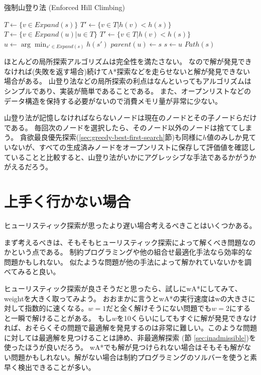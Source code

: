 \begin{algorithm}
\caption{強制山登り法 (Enforced Hill Climbing)}
	 {
	  $T \leftarrow \{v \in Expand(s)\}$\;
	  $T' \leftarrow \{v \in T | h(v) < h(s) \}$\;
           {
            $T \leftarrow \{v \in Expand(u) | u \in T\}$\;
 	    $T' \leftarrow \{v \in T | h(v) < h(s) \}$\;
          }
	  $u \leftarrow \arg \min_{s' \in Expand(s)} h(s')$\;
          $parent(u) \leftarrow s$\;
          $s \leftarrow u$\;
	}
	\Return $Path(s)$
\label{alg:enforced-hill-climbing}
\end{algorithm}


ほとんどの局所探索アルゴリズムは完全性を満たさない。
なので解が発見できなければ(失敗を返す場合)続けてA*探索などを走らせないと解が発見できない場合がある。
山登り法などの局所探索の利点はなんといってもアルゴリズムはシンプルであり、実装が簡単であることである。
また、オープンリストなどのデータ構造を保持する必要がないので消費メモリ量が非常に少ない。

山登り法が記憶しなければならないノードは現在のノードとその子ノードらだけである。
毎回次のノードを選択したら、そのノード以外のノードは捨ててしまう。
貪欲最良優先探索(\ref{sec:greedy-best-first-search}節)も同様に$h$値のみしか見ていないが、すべての生成済みノードをオープンリストに保存して評価値を確認していることと比較すると、山登り法がいかにアグレッシブな手法であるかがうかがえるだろう。

\section{上手く行かない場合}

ヒューリスティック探索が思ったより遅い場合考えるべきことはいくつかある。

まず考えるべきは、そもそもヒューリスティック探索によって解くべき問題なのかという点である。
制約プログラミングや他の組合せ最適化手法なら効率的な問題かもしれない。
似たような問題が他の手法によって解かれていないかを調べてみると良い。

ヒューリスティック探索が良さそうだと思ったら、試しにwA*にしてみて、weightを大きく取ってみよう。
おおまかに言うとwA*の実行速度はwの大きさに対して指数的に速くなる。$w=1$だと全く解けそうにない問題でも$w=2$にすると一瞬で解けることがある。
もし$w$を10くらいにしてもすぐに解が発見できなければ、おそらくその問題で最適解を発見するのは非常に難しい。このような問題に対しては最適解を見つけることは諦め、非最適解探索 (節 \ref{sec:inadmissible})を使ったほうが良いだろう。
wA*でも解が見つけられない場合はそもそも解がない問題かもしれない。解がない場合は制約プログラミングのソルバーを使うと素早く検出できることが多い。

